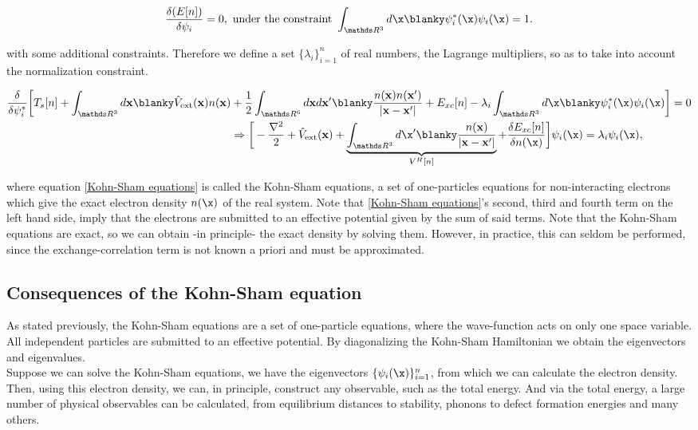 \documentclass{homework}
\begin{document}
$$
\frac{\delta(E[n])}{\delta \psi_i} = 0, \textnormal{ under the constraint } \int_{\R^3} d\x \blanky \psi_{i}^{*}(\x) \psi_i(\x) = 1.
$$

with some additional constraints. Therefore we define a set $\{\lambda_i\}_{i=1}^{n}$ of real numbers, the Lagrange multipliers, so as to take into account the normalization constraint. 

\begin{align}
    \frac{\delta}{\delta \psi_{i}^{*}} \bigg[T_s[n] + \int_{\R^3} d{\bf x} \blanky \hat{V}_{\textnormal{ext}}({\bf x}) n({\bf x}) &+ \frac{1}{2} \int_{\R^6} d{\bf x} d{\bf x'} \blanky \frac{n({\bf x})n({\bf x'})}{|{\bf x}-{\bf x'}|} + E_{xc}[n] - \lambda_i \int_{\R^3} d\x \blanky \psi_{i}^{*}(\x) \psi_i(\x)\bigg] = 0 \\
&\Rightarrow \bigg[-\frac{\nabla^2}{2} + \hat{V}_{\textnormal{ext}}({\bf x}) + \underbrace{\int_{\R^3}d\x' \blanky \frac{n({\bf x})}{|{\bf x}-{\bf x'}|}}_{V^H[n]} + \frac{\delta E_{xc}[n]}{\delta n(\x)}\bigg] \psi_i(\x) = \lambda_i \psi_i(\x),
\label{Kohn-Sham equations}
\end{align}

where equation \eqref{Kohn-Sham equations} is called the Kohn-Sham equations, a set of one-particles equations for non-interacting electrons which give the exact electron density $n(\x)$ of the real system. Note that \eqref{Kohn-Sham equations}'s second, third and fourth term on the left hand side, imply that the electrons are submitted to an effective potential given by the sum of said terms. Note that the Kohn-Sham equations are exact, so we can obtain -in principle- the exact density by solving them. However, in practice, this can seldom be performed, since the exchange-correlation term is not known a priori and must be approximated. \\

\subsection{Consequences of the Kohn-Sham equation}

As stated previously, the Kohn-Sham equations are a set of one-particle equations, where the wave-function acts on only one space variable. All independent particles are submitted to an effective potential. By diagonalizing the Kohn-Sham Hamiltonian we obtain the eigenvectors and eigenvalues. \\

Suppose we can solve the Kohn-Sham equations, we have the eigenvectors $\{\psi_{i}(\x)\}_{i=1}^{n}$, from which we can calculate the electron density. Then, using this electron density, we can, in principle, construct any observable, such as the total energy. And via the total energy, a large number of physical observables can be calculated, from equilibrium distances to stability, phonons to defect formation energies and many others. \\
\end{document}
